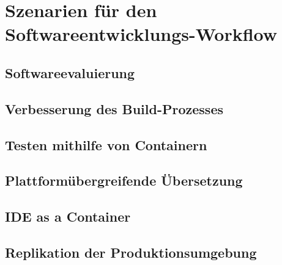\chapter{Szenarien für den Softwareentwicklungs-Workflow}
\label{cha:szenarien}
\section{Softwareevaluierung}
\label{sec:softwareevaluierung}
\section{Verbesserung des Build-Prozesses}
\label{sec:build-prozess-verbesserung}
\section{Testen mithilfe von Containern}
\label{sec:containerbasiertes-testen}
\section{Plattformübergreifende Übersetzung}
\label{sec:plattformuebergreifende-uebersetzung}
\section{IDE as a Container}
\label{sec:ideasacontainer}
\section{Replikation der Produktionsumgebung}
\label{sec:replikation-produktionsumgebung}


